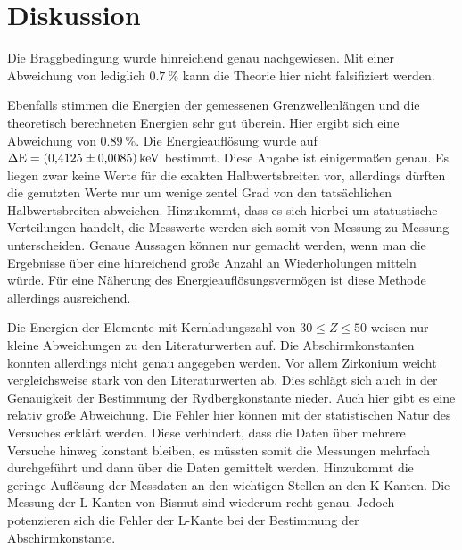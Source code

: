 \section{Diskussion}
\label{sec:Diskussion}

Die Braggbedingung wurde hinreichend genau nachgewiesen.
Mit einer Abweichung von lediglich $\SI{0.7}{\percent}$ kann die Theorie hier nicht falsifiziert werden.

Ebenfalls stimmen die Energien der gemessenen Grenzwellenlängen und die theoretisch berechneten Energien sehr gut überein.
Hier ergibt sich eine Abweichung von $\SI{0.89}{\percent}$.
Die Energieauflösung wurde auf $\Delta\text{E} = \SI{0.4125\pm0.0085}{\kilo\electronvolt}$ bestimmt.
Diese Angabe ist einigermaßen genau.
Es liegen zwar keine Werte für die exakten Halbwertsbreiten vor, allerdings dürften die genutzten Werte nur um wenige zentel Grad von den tatsächlichen Halbwertsbreiten abweichen.
Hinzukommt, dass es sich hierbei um statustische Verteilungen handelt, die Messwerte werden sich somit von Messung zu Messung unterscheiden.
Genaue Aussagen können nur gemacht werden, wenn man die Ergebnisse über eine hinreichend große Anzahl an Wiederholungen mitteln würde.
Für eine Näherung des Energieauflösungsvermögen ist diese Methode allerdings ausreichend.

Die Energien der Elemente mit Kernladungszahl von $30 \leq Z \leq 50$ weisen nur kleine Abweichungen zu den Literaturwerten auf.
Die Abschirmkonstanten konnten allerdings nicht genau angegeben werden.
Vor allem Zirkonium weicht vergleichsweise stark von den Literaturwerten ab.
Dies schlägt sich auch in der Genauigkeit der Bestimmung der Rydbergkonstante nieder.
Auch hier gibt es eine relativ große Abweichung.
Die Fehler hier können mit der statistischen Natur des Versuches erklärt werden.
Diese verhindert, dass die Daten über mehrere Versuche hinweg konstant bleiben, es müssten somit die Messungen mehrfach durchgeführt und dann über die Daten gemittelt werden.
Hinzukommt die geringe Auflösung der Messdaten an den wichtigen Stellen an den K-Kanten.
Die Messung der L-Kanten von Bismut sind wiederum recht genau.
Jedoch potenzieren sich die Fehler der L-Kante bei der Bestimmung der Abschirmkonstante.
